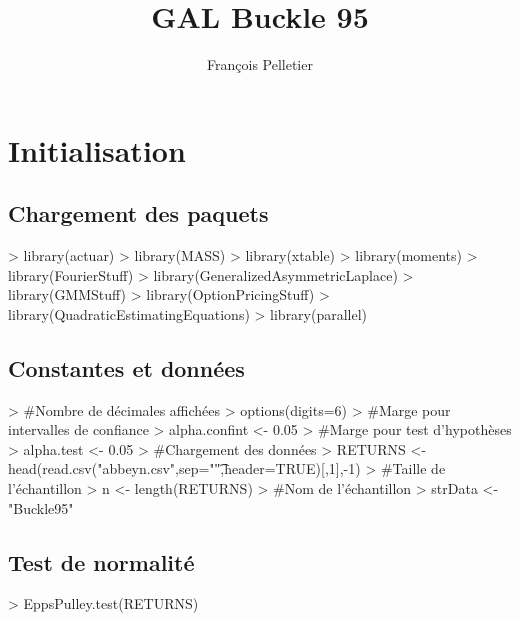 \documentclass[letter]{report}
\begin{document}


\title{GAL Buckle 95}
\author{François Pelletier}
\maketitle
\tableofcontents

\chapter{Initialisation}

\section{Chargement des paquets}
\begin{Schunk}
\begin{Sinput}
> library(actuar)
> library(MASS)
> library(xtable)
> library(moments)
> library(FourierStuff)
> library(GeneralizedAsymmetricLaplace)
> library(GMMStuff)
> library(OptionPricingStuff)
> library(QuadraticEstimatingEquations)
> library(parallel)
\end{Sinput}
\end{Schunk}

\section{Constantes et données}

\begin{Schunk}
\begin{Sinput}
> #Nombre de décimales affichées
> options(digits=6)
> #Marge pour intervalles de confiance
> alpha.confint <- 0.05 
> #Marge pour test d'hypothèses
> alpha.test <- 0.05
> #Chargement des données
> RETURNS <- head(read.csv("abbeyn.csv",sep="\t",header=TRUE)[,1],-1)
> #Taille de l'échantillon
> n <- length(RETURNS)
> #Nom de l'échantillon
> strData <- "Buckle95"
\end{Sinput}
\end{Schunk}

\section{Test de normalité}

\begin{Schunk}
\begin{Sinput}
> EppsPulley.test(RETURNS)
\end{Sinput}
\end{Schunk}
\end{document}
